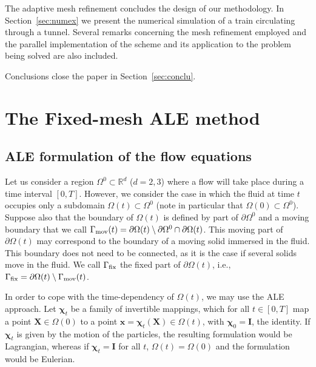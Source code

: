 \documentclass[11pt,a4paper,oneside,reqno]{amsart}
\def\map{{\bm\chi}}
\def\mapt{{\bm\chi}_t}
\def\X{{\bm X}}
\def\x{{\bm x}}
\begin{document}
The adaptive mesh refinement concludes the design of our methodology. In Section~\ref{sec:numex} we present the numerical simulation of a train circulating through a tunnel. %
Several remarks concerning the mesh refinement employed and the parallel implementation of the scheme and its application to the problem being solved are also included. 

Conclusions close the paper in Section~\ref{sec:conclu}.

\section{The Fixed-mesh ALE method}\label{sec:fmale}

\subsection{ALE formulation of the flow equations}

Let us consider a region $\Omega^0\subset{\mathbb R}^d$ ($d= 2,3$) where a flow will take place during a time interval $[0,T]$. However, we consider the case in which the fluid at time $t$ occupies only a subdomain $\Omega(t)\subset \Omega^0$ (note in particular that $\Omega(0)\subset \Omega^0$). Suppose also that the boundary of $\Omega(t)$ is defined by part of $\partial\Omega^0$ and a moving
boundary that we call $\Gamma_{\rm mov}(t) = \partial\Omega(t) \setminus \partial\Omega^0\cap\partial\Omega(t)$. This moving part of $\partial\Omega(t)$ may correspond to the boundary of a moving solid immersed in the fluid. This boundary does not need to be connected, as it is the case if several solids move in the fluid. We call $\Gamma_{\rm fix}$ the fixed part of $\partial\Omega(t)$, i.e.,  $\Gamma_{\rm fix} = \partial\Omega(t) \setminus \Gamma_{\rm mov}(t)$. 

In order to cope with the time-dependency of $\Omega(t)$, we may use the ALE approach. Let $\mapt$ be a family of invertible mappings, which for all $t\in[0,T]$ map a point $\X\in\Omega(0)$ to a point $\x = \mapt(\X)\in \Omega(t)$, with $\map_0 = {\bm I}$, the identity. If $\mapt$ is given by  the motion of the particles, the resulting formulation would be Lagrangian, whereas if $\mapt = {\bm I}$ for all $t$,  $\Omega(t) = \Omega(0)$ and the formulation would be Eulerian. 
\end{document}
